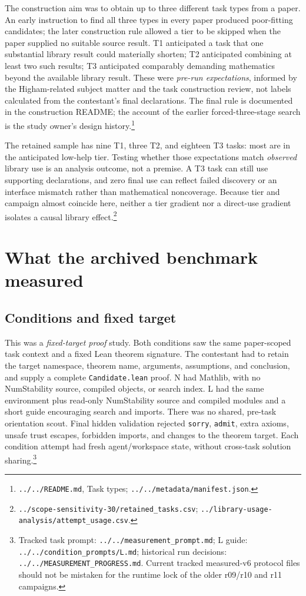 \documentclass[10pt]{article}
\newcommand{\pathref}[1]{\nolinkurl{#1}}
\begin{document}
The construction aim was to obtain up to three different task types from a paper. An early instruction to find all three types in every paper produced poor-fitting candidates; the later construction rule allowed a tier to be skipped when the paper supplied no suitable source result. T1 anticipated a task that one substantial library result could materially shorten; T2 anticipated combining at least two such results; T3 anticipated comparably demanding mathematics beyond the available library result. These were \emph{pre-run expectations}, informed by the Higham-related subject matter and the task construction review, not labels calculated from the contestant's final declarations. The final rule is documented in the construction README; the account of the earlier forced-three-stage search is the study owner's design history.\footnote{\pathref{../../README.md}, Task types; \pathref{../../metadata/manifest.json}.}

The retained sample has nine T1, three T2, and eighteen T3 tasks: most are in the anticipated low-help tier. Testing whether those expectations match \emph{observed} library use is an analysis outcome, not a premise. A T3 task can still use supporting declarations, and zero final use can reflect failed discovery or an interface mismatch rather than mathematical noncoverage. Because tier and campaign almost coincide here, neither a tier gradient nor a direct-use gradient isolates a causal library effect.\footnote{\pathref{../scope-sensitivity-30/retained_tasks.csv}; \pathref{../library-usage-analysis/attempt_usage.csv}.}

\section{What the archived benchmark measured}
\subsection*{Conditions and fixed target}
This was a \emph{fixed-target proof} study. Both conditions saw the same paper-scoped task context and a fixed Lean theorem signature. The contestant had to retain the target namespace, theorem name, arguments, assumptions, and conclusion, and supply a complete \texttt{Candidate.lean} proof. N had Mathlib, with no NumStability source, compiled objects, or search index. L had the same environment plus read-only NumStability source and compiled modules and a short guide encouraging search and imports. There was no shared, pre-task orientation scout. Final hidden validation rejected \texttt{sorry}, \texttt{admit}, extra axioms, unsafe trust escapes, forbidden imports, and changes to the theorem target. Each condition attempt had fresh agent/workspace state, without cross-task solution sharing.\footnote{Tracked task prompt: \pathref{../../measurement_prompt.md}; L guide: \pathref{../../condition_prompts/L.md}; historical run decisions: \pathref{../../MEASUREMENT_PROGRESS.md}. Current tracked measured-v6 protocol files should not be mistaken for the runtime lock of the older r09/r10 and r11 campaigns.}
\end{document}
